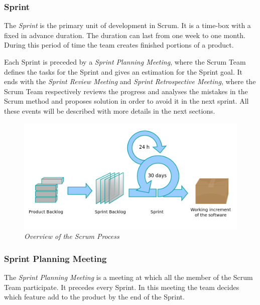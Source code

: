 			\subsubsection{Sprint}
			The \emph{Sprint} is the primary unit of development in Scrum. It is a time-box with a fixed in advance duration. The duration can last from one week to one month. During this period of time the team creates finished portions of a product. 
	
			Each Sprint is preceded by a \emph{Sprint Planning Meeting}, where the Scrum Team defines the tasks for the Sprint and gives an estimation for the Sprint goal. It ends with the \emph{Sprint Review Meeting} and \emph{Sprint Retrospective Meeting}, where the Scrum Team respectively reviews the progress and analyses the mistakes in the Scrum method and proposes solution in order to avoid it in the next sprint. All these events will be described with more details in the next sections. 

			\begin{figure}[h]
			  \begin{center} 
			    \includegraphics[scale=0.45]{images/ch_04/scrum_process.png}
			  \end{center} 
			  \caption{\textit{Overview of the Scrum Process}}  
			  \label{fig:ScrumProcess}
		  	\end{figure}


			\subsubsection{Sprint Planning Meeting}
			The \emph{Sprint Planning Meeting} is a meeting at which all the member of the Scrum Team participate. It precedes every Sprint. In this meeting the team decides which feature add to the product by the end of the Sprint.

